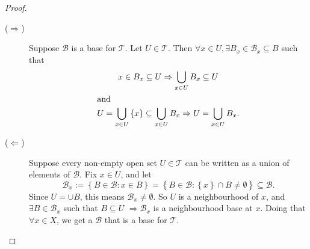 \begin{proof} \leavevmode
    \begin{description}
        \item[($\Rightarrow$)] Suppose $\mathcal{B}$ is a base for $\mathcal{T}$. Let $U \in \mathcal{T}$.
        Then $\forall x \in U, \exists B_x \in \mathcal{B}_x \subseteq B$ such that
        \begin{gather*}
            x \in B_x \subseteq U \Rightarrow \bigcup_{x \in U} B_x \subseteq U \\
            \shortintertext{and}
            U = \bigcup_{x \in U} \left\{ x \right\} \subseteq \bigcup_{x \in U} B_x \Rightarrow 
            U = \bigcup_{x \in U} B_x.
        \end{gather*}

        \item[($\Leftarrow$)] Suppose every non-empty open set $U \in \mathcal{T}$ can be written as a union of
        elements of $\mathcal{B}$. Fix $x \in U$, and let
        \[
            \mathcal{B}_x := \left\{ B \in \mathcal{B} : x \in B \right\} 
            = \left\{ B \in \mathcal{B} : \left\{ x \right\} \cap B \neq \emptyset \right\}
            \subseteq \mathcal{B}.
        \]
        Since $U = \cup B$, this means $\mathcal{B}_x \neq \emptyset$. So $U$ is
        a neighbourhood of $x$, and $\exists B \in \mathcal{B}_x$ such that $B \subseteq U$
        $\Rightarrow \mathcal{B}_x$ is a neighbourhood base at $x$. Doing that $\forall x \in X$,
        we get a $\mathcal{B}$ that is a base for $\mathcal{T}$. \qedhere
    \end{description}
\end{proof}

